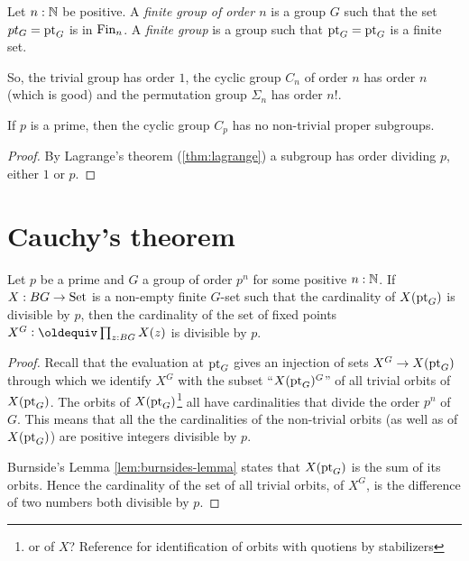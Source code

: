 \begin{definition}
  \label{def:finitegrd}Let $n:\mathbb{N}$ be positive.  
A \emph{finite group of order $n$} is a group $G$ such that the set $pt_G={\mathord{\mathrm{pt}}}_G$ is in $\operatorname{Fin}_n$. 
A \emph{finite group} is a group such that ${\mathord{\mathrm{pt}}}_G={\mathord{\mathrm{pt}}}_G$ is a finite set. 
\end{definition}
So, the trivial group has order $1$, the cyclic group $C_n$ of order $n$ has order $n$ (which is good) and the permutation group $\Sigma_n$ has order $n!$.
    \begin{lemma}
      If $p$ is a prime, then  the cyclic group $C_p$ has no non-trivial proper subgroups.
    \end{lemma}
    \begin{proof}
      By Lagrange's theorem (\cref{thm:lagrange}) a subgroup has order dividing $p$, \ie either $1$ or $p$.
    \end{proof}


\section{Cauchy's theorem}
\begin{lemma}
  \label{lem:fixedptsize}
  Let $p$ be a prime and $G$ a group of order $p^n$ for some positive $n:\mathbb{N}$.  If $X:BG\to\mathord{\mathrm{Set}}$ is a non-empty finite $G$-set such that the cardinality of $X({\mathord{\mathrm{pt}}}_G)$ is divisible by $p$, then the cardinality of the set of fixed points $X^G\defequi\prod_{z:BG}X(z)$ is divisible by $p$.
\end{lemma}
\begin{proof}
  Recall that the evaluation at ${\mathord{\mathrm{pt}}}_G$ gives an injection of sets $X^G\to X({\mathord{\mathrm{pt}}}_G)$ through which we identify $X^G$ with the subset ``$X({\mathord{\mathrm{pt}}}_G)^G$'' of all trivial orbits of $X({\mathord{\mathrm{pt}}}_G)$.
 The orbits of $X({\mathord{\mathrm{pt}}}_G)$\footnote{or of $X$?  Reference for identification of orbits with quotiens by stabilizers} all have cardinalities that divide the order $p^n$ of $G$.  
This means that all the the cardinalities of the non-trivial orbits (as well as of $X({\mathord{\mathrm{pt}}}_G)$) are positive integers divisible by $p$. 

 Burnside's Lemma \cref{lem:burnsides-lemma} states that $X({\mathord{\mathrm{pt}}}_G)$ is the sum of its orbits.
Hence the cardinality of the set of all trivial orbits, \ie of $X^G$, is the difference of two numbers both divisible by $p$.  
\end{proof}


